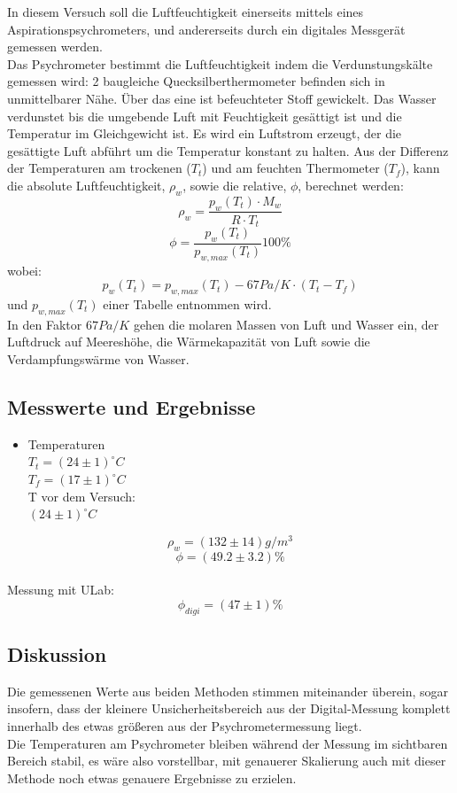\documentclass[12pt,a4paper]{article}
\begin{document}
\begin{multicols}{2}
\noindent In diesem Versuch soll die Luftfeuchtigkeit einerseits mittels eines Aspirationspsychrometers, und andererseits durch ein digitales Messgerät gemessen werden.\\
Das Psychrometer bestimmt die Luftfeuchtigkeit indem die Verdunstungskälte gemessen wird: 2 baugleiche Quecksilberthermometer befinden sich in unmittelbarer Nähe. Über das eine ist befeuchteter Stoff gewickelt. Das Wasser verdunstet bis die umgebende Luft mit Feuchtigkeit gesättigt ist und die Temperatur im Gleichgewicht ist. Es wird ein Luftstrom erzeugt, der die gesättigte Luft abführt um die Temperatur konstant zu halten. Aus der Differenz der Temperaturen am trockenen ($T_t$) und am feuchten Thermometer ($T_f$), kann die absolute Luftfeuchtigkeit, $\rho_w$, sowie die relative, $\phi$, berechnet werden:\\
$$\rho_w=\frac{p_w(T_t)\cdot M_w}{R \cdot T_t}$$
$$\phi= \frac{p_w(T_t)}{p_{w,max}(T_t)}100\%$$
wobei:
$$p_w(T_t)=p_{w,max}(T_t)-67 Pa/K \cdot (T_t-T_f)$$
und $p_{w,max}(T_t)$ einer Tabelle entnommen wird.\\
In den Faktor $67Pa/K$ gehen die molaren Massen von Luft und Wasser ein, der Luftdruck auf Meereshöhe, die Wärmekapazität von Luft sowie die Verdampfungswärme von Wasser.

\subsection{Messwerte und Ergebnisse}
\begin {itemize}
	\item Temperaturen\\
	$T_{t} = (24 \pm 1)^{\circ}C$\\
	$T_{f} = (17 \pm 1)^{\circ}C$\\
	T vor dem Versuch:\\
	$(24 \pm 1)^{\circ}C$\\
\end{itemize}

$$\rho_w= (132 \pm 14)g/m^3$$
$$\phi =(49.2\pm 3.2)\%$$
\\
Messung mit ULab:
$$\phi_{digi}=(47 \pm 1)\%$$

\subsection{Diskussion}

Die gemessenen Werte aus beiden Methoden stimmen miteinander überein, sogar insofern, dass der kleinere Unsicherheitsbereich aus der Digital-Messung komplett innerhalb des etwas größeren aus der Psychrometermessung liegt.\\
Die Temperaturen am Psychrometer bleiben während der Messung im sichtbaren Bereich stabil, es wäre also vorstellbar, mit genauerer Skalierung auch mit dieser Methode noch etwas genauere Ergebnisse zu erzielen.\\



\end{multicols}
\end{document}

